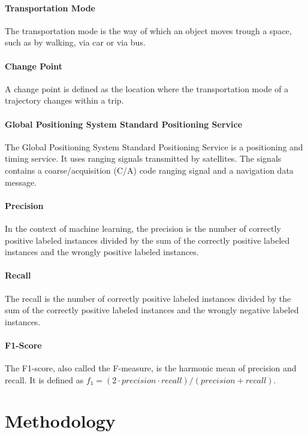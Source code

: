 \paragraph{Transportation Mode} The transportation mode is the way of which an object moves trough a space, such as by walking, via car or via bus.  \cite{Bolbol2012}

\paragraph{Change Point} A change point is defined as the location where the transportation mode of a trajectory changes within a trip. \cite{Zheng2008}

\paragraph{Global Positioning System Standard Positioning Service} The Global Positioning System Standard Positioning Service is a positioning and timing service. It uses ranging signals transmitted by satellites. The signals contains a  coarse/acquisition (C/A)  code  ranging  signal and a navigation data message. 
\cite{dod2008global}


\paragraph{Precision} In the context of machine learning, the precision is the number of correctly positive labeled instances divided by the sum of the correctly positive labeled instances and the wrongly positive labeled instances. \cite{davis2006relationship}

\paragraph{Recall} The recall is the number of correctly positive labeled instances divided by the sum of the correctly positive labeled instances and the wrongly negative labeled instances. \cite{davis2006relationship}

\paragraph{F1-Score} The F1-score, also called the F-measure, is the harmonic mean of precision and recall. It is defined as $f_1 = (2 \cdot precision \cdot recall) / (precision + recall)$. \cite{sasaki2007truth}


\section{Methodology}

